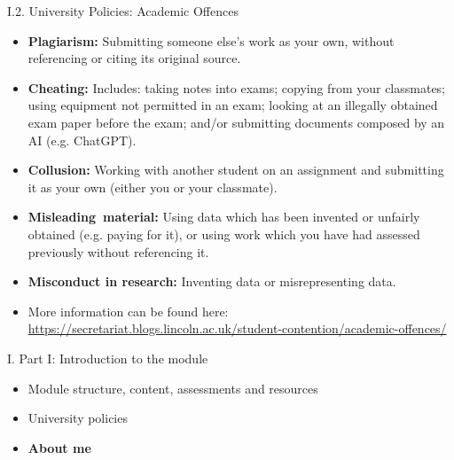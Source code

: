 \documentclass[handout]{beamer}
\newcommand{\strong}[1]{\textbf{\color{teal} #1}}
\newcommand{\stronger}[1]{\textbf{\color{purple} #1}}
\begin{document}
\begin{frame}{I.2. University Policies: Academic Offences}
\begin{itemize}
\item \strong{Plagiarism:} Submitting someone else's work as your own, without referencing or citing its original source.
\item \strong{Cheating:} Includes: taking notes into exams; copying from your classmates; using equipment not permitted in an exam; looking at an illegally obtained exam paper before the exam; and/or submitting documents composed by an AI (e.g. ChatGPT).
\item \strong{Collusion:} Working with another student on an assignment and submitting it as your own (either you or your classmate).
\item \strong{Misleading material:} Using data which has been invented or unfairly obtained (e.g. paying for it), or using work which you have had assessed previously without referencing it.
\item \strong{Misconduct in research:} Inventing data or misrepresenting data.
\item More information can be found here:
\url{https://secretariat.blogs.lincoln.ac.uk/student-contention/academic-offences/}
\end{itemize}
\end{frame}
\begin{frame}{I. Part I: Introduction to the module}
\begin{itemize}
\item[1.] Module structure, content, assessments and resources
\item[2.] University policies
\item[3.] \stronger{About me}

\end{itemize}
\end{frame}
\end{document}

